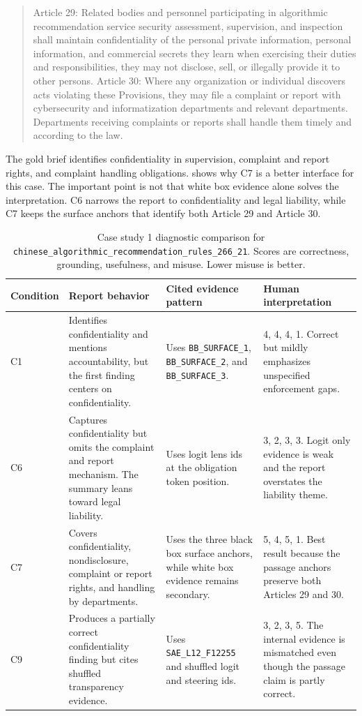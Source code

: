 \documentclass{article}
\begin{document}
\begin{quote}
\small
Article 29: Related bodies and personnel participating in algorithmic recommendation service security assessment, supervision, and inspection shall maintain confidentiality of the personal private information, personal information, and commercial secrets they learn when exercising their duties and responsibilities, they may not disclose, sell, or illegally provide it to other persons. Article 30: Where any organization or individual discovers acts violating these Provisions, they may file a complaint or report with cybersecurity and informatization departments and relevant departments. Departments receiving complaints or reports shall handle them timely and according to the law.
\end{quote}

The gold brief identifies confidentiality in supervision, complaint and report rights, and complaint handling obligations.  shows why C7 is a better interface for this case. The important point is not that white box evidence alone solves the interpretation. C6 narrows the report to confidentiality and legal liability, while C7 keeps the surface anchors that identify both Article 29 and Article 30.

\begin{table}[h]
    \centering
    \caption{Case study 1 diagnostic comparison for \texttt{chinese\_algorithmic\_recommendation\_rules\_266\_21}. Scores are correctness, grounding, usefulness, and misuse. Lower misuse is better.}
    \label{tab:appendix-cn21-case}
    \scriptsize
    \begin{tabular}{p{}p{}p{}p{}}
        \toprule
        Condition & Report behavior & Cited evidence pattern & Human interpretation \\
        \midrule
        C1 & Identifies confidentiality and mentions accountability, but the first finding centers on confidentiality. & Uses \texttt{BB\_SURFACE\_1}, \texttt{BB\_SURFACE\_2}, and \texttt{BB\_SURFACE\_3}. & 4, 4, 4, 1. Correct but mildly emphasizes unspecified enforcement gaps. \\
        C6 & Captures confidentiality but omits the complaint and report mechanism. The summary leans toward legal liability. & Uses logit lens ids at the obligation token position. & 3, 2, 3, 3. Logit only evidence is weak and the report overstates the liability theme. \\
        C7 & Covers confidentiality, nondisclosure, complaint or report rights, and handling by departments. & Uses the three black box surface anchors, while white box evidence remains secondary. & 5, 4, 5, 1. Best result because the passage anchors preserve both Articles 29 and 30. \\
        C9 & Produces a partially correct confidentiality finding but cites shuffled transparency evidence. & Uses \texttt{SAE\_L12\_F12255} and shuffled logit and steering ids. & 3, 2, 3, 5. The internal evidence is mismatched even though the passage claim is partly correct. \\
        \bottomrule
    \end{tabular}
\end{table}
\end{document}
